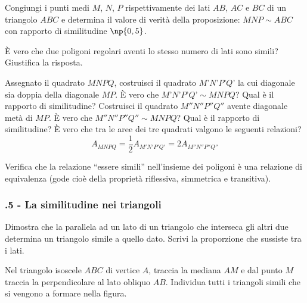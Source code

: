 \begin{multicols}{2}
\begin{esercizio}
\label{ese:6.52}
Congiungi i punti medi $M$, $N$, $P$ rispettivamente dei lati $AB$, $AC$ e $BC$ di un triangolo $ABC$ e determina il valore di verità della proposizione: $MNP\sim ABC$ con rapporto di similitudine $\np{0,5}$.
\end{esercizio}

\begin{esercizio}
\label{ese:6.53}
\`E vero che due poligoni regolari aventi lo stesso numero di lati sono simili? Giustifica la risposta.
\end{esercizio}

\begin{esercizio}
\label{ese:6.54}
Assegnato il quadrato $MNPQ$, costruisci il quadrato $M’N’P’Q’$ la cui diagonale sia doppia della diagonale $MP$. \`E vero che $M’N’P’Q’\sim MNPQ$? Qual è il rapporto di similitudine? Costruisci il quadrato $M''N''P''Q''$ avente diagonale metà di $MP$. \`E vero che $M''N''P''Q''\sim MNPQ$? Qual è il rapporto di similitudine? \`E vero che tra le aree dei tre quadrati valgono le seguenti relazioni?
\[A_{MNPQ}=\frac{1}{2}A_{M'N'P'Q'}=2A_{M''N''P''Q''} \]
\end{esercizio}

\begin{esercizio}
\label{ese:6.55}
Verifica che la relazione ``essere simili'' nell'insieme dei poligoni è una relazione di equivalenza (gode cioè della proprietà riflessiva, simmetrica e transitiva).
\end{esercizio}

\subsubsection*{\thechapter.5 - La similitudine nei triangoli}

\begin{esercizio}
\label{ese:6.56}
Dimostra che la parallela ad un lato di un triangolo che interseca gli altri due determina un triangolo simile a quello dato. Scrivi la proporzione che sussiste tra i lati.
\end{esercizio}

\begin{esercizio}
\label{ese:6.57}
Nel triangolo isoscele $ABC$ di vertice $A$, traccia la mediana $AM$ e dal punto $M$ traccia la perpendicolare al lato obliquo $AB$. Individua tutti i triangoli simili che si vengono a formare nella figura.
\end{esercizio}


\end{multicols}
